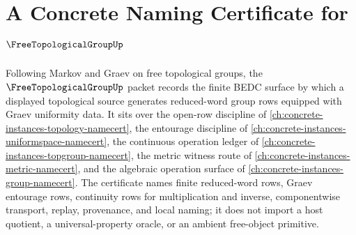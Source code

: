\chapter{A Concrete Naming Certificate for $\FreeTopologicalGroupUp$}
\label{ch:concrete-instances-free-topological-group-namecert}

Following Markov and Graev on free topological groups, the $\FreeTopologicalGroupUp$ packet records the finite BEDC surface by which a displayed topological source generates reduced-word group rows equipped with Graev uniformity data. It sits over the open-row discipline of \autoref{ch:concrete-instances-topology-namecert}, the entourage discipline of \autoref{ch:concrete-instances-uniformspace-namecert}, the continuous operation ledger of \autoref{ch:concrete-instances-topgroup-namecert}, the metric witness route of \autoref{ch:concrete-instances-metric-namecert}, and the algebraic operation surface of \autoref{ch:concrete-instances-group-namecert}. The certificate names finite reduced-word rows, Graev entourage rows, continuity rows for multiplication and inverse, componentwise transport, replay, provenance, and local naming; it does not import a host quotient, a universal-property oracle, or an ambient free-object primitive.

